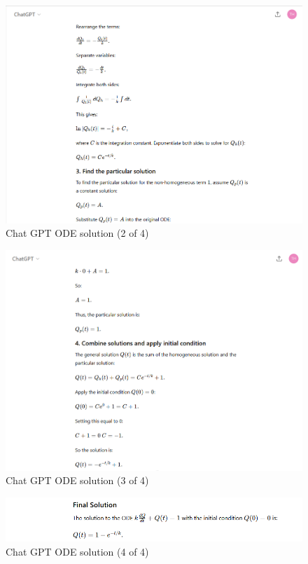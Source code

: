 \documentclass[12pt]{article}
\begin{document}
\begin{enumerate}
\begin{figure}[h!] %
   \centering
   \includegraphics[width=6in]{chatgpt2of4.png} 
   \caption{Chat GPT ODE solution (2 of 4)}
   \label{fig:chatgpt2of4}
\end{figure}

\begin{figure}[h!] %
   \centering
   \includegraphics[width=6in]{chatgpt3of4.png} 
   \caption{Chat GPT ODE solution (3 of 4)}
   \label{fig:chatgpt3of4}
\end{figure}

\begin{figure}[h!] %
   \centering
   \includegraphics[width=6in]{chatgpt4of4.png} 
   \caption{Chat GPT ODE solution (4 of 4)}
   \label{fig:chatgpt4of4}
\end{figure}


\end{enumerate}
\end{document}
